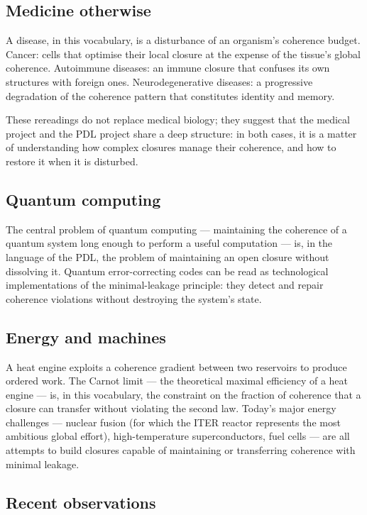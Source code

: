 \documentclass[11pt, a4paper, openright]{book}
\begin{document}
\subsection*{Medicine otherwise}

A disease, in this vocabulary, is a disturbance of an organism’s coherence budget. Cancer: cells that optimise their local closure at the expense of the tissue’s global coherence. Autoimmune diseases: an immune closure that confuses its own structures with foreign ones. Neurodegenerative diseases: a progressive degradation of the coherence pattern that constitutes identity and memory.

\medskip

These rereadings do not replace medical biology; they suggest that the medical project and the PDL project share a deep structure: in both cases, it is a matter of understanding how complex closures manage their coherence, and how to restore it when it is disturbed.

\subsection*{Quantum computing}

The central problem of quantum computing — maintaining the coherence of a quantum system long enough to perform a useful computation — is, in the language of the PDL, the problem of maintaining an open closure without dissolving it. Quantum error-correcting codes can be read as technological implementations of the minimal-leakage principle: they detect and repair coherence violations without destroying the system’s state.

\subsection*{Energy and machines}

A heat engine exploits a coherence gradient between two reservoirs to produce ordered work. The Carnot limit — the theoretical maximal efficiency of a heat engine — is, in this vocabulary, the constraint on the fraction of coherence that a closure can transfer without violating the second law. Today’s major energy challenges — nuclear fusion (for which the ITER reactor represents the most ambitious global effort), high-temperature superconductors, fuel cells — are all attempts to build closures capable of maintaining or transferring coherence with minimal leakage.

\subsection*{Recent observations}
\end{document}
